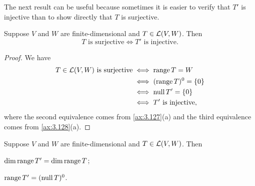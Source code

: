 The next result can be useful because sometimes it is easier to verify that $T'$
is injective than to show directly that $T$ is surjective.

\begin{result}\label{ax:3.129}
Suppose $V$ and $W$ are finite-dimensional and $T\in\mathcal{L}(V,W)$. Then
\[ T \text{ is surjective} \iff T' \text{ is injective}. \]
\end{result}

\begin{proof}
We have
\begin{align*}
T\in\mathcal{L}(V,W)\text{ is surjective} &\iff \operatorname{range} T=W\\
  &\iff (\operatorname{range} T)^0=\{0\}\\
  &\iff \operatorname{null} T'=\{0\}\\
  &\iff T'\text{ is injective},
\end{align*}
where the second equivalence comes from \ref{ax:3.127}(a) and the third
equivalence comes from \ref{ax:3.128}(a).
\end{proof}

\begin{result}\label{ax:3.130}
Suppose $V$ and $W$ are finite-dimensional and $T\in\mathcal{L}(V,W)$. Then
\begin{parts}
\item $\operatorname{dim}\operatorname{range} T'=\operatorname{dim}\operatorname{range} T$;
\item $\operatorname{range} T'=(\operatorname{null} T)^0$.
\end{parts}
\end{result}

